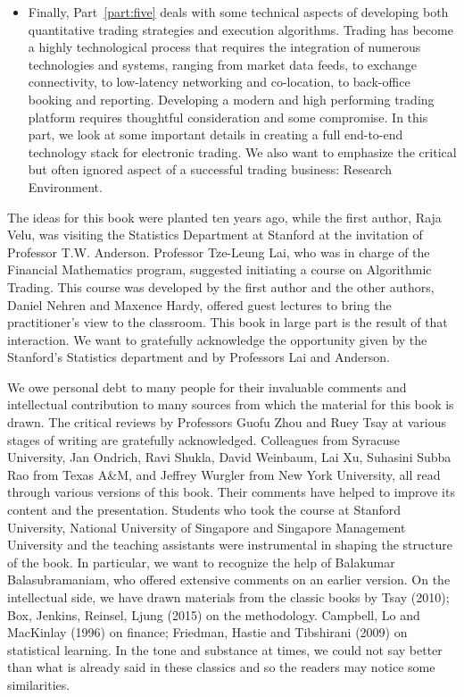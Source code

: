 \begin{itemize}
\item Finally, Part~\ref{part:five} deals with some technical aspects of developing both quantitative trading strategies and execution algorithms. Trading has become a highly technological process that requires the integration of numerous technologies and systems,  ranging from market data feeds, to exchange connectivity, to low-latency networking and co-location, to back-office booking and reporting. Developing a modern and high performing trading platform requires thoughtful consideration and some compromise. In this part, we look at some important details in creating a full end-to-end technology stack for electronic trading. We also want to emphasize the critical but often ignored aspect of a successful trading business: Research Environment. \twomedskip
\end{itemize} 


 The ideas for this book were planted ten years ago, while the first author, Raja Velu, was visiting the Statistics Department at Stanford at the invitation of Professor T.W. Anderson. Professor Tze-Leung Lai, who was in charge of the Financial Mathematics program, suggested initiating a course on Algorithmic Trading. This course was developed by the first author and the other authors, Daniel Nehren and Maxence Hardy, offered guest lectures to bring the practitioner's view to the classroom. This book in large part is the result of that interaction. We want to gratefully acknowledge the opportunity given by the Stanford's Statistics department and by Professors Lai and Anderson. 


We owe personal debt to many people for their invaluable comments and intellectual contribution to many sources from which the material for this book is drawn. The critical reviews by Professors Guofu Zhou and Ruey Tsay at various stages of writing are gratefully acknowledged. Colleagues from Syracuse University, Jan Ondrich, Ravi Shukla, David Weinbaum, Lai Xu, Suhasini Subba Rao from Texas A\&M, and Jeffrey Wurgler from New York University, all read through various versions of this book. Their comments have helped to improve its content and the presentation. Students who took the course at Stanford University, National University of Singapore and Singapore Management University and the teaching assistants were instrumental in shaping the structure of the book. In particular, we want to recognize the help of Balakumar Balasubramaniam, who offered extensive comments on an earlier version. On the intellectual side, we have drawn materials from the classic books by Tsay (2010); Box, Jenkins, Reinsel, Ljung (2015) on the methodology. Campbell, Lo and MacKinlay (1996) on finance; Friedman, Hastie and Tibshirani (2009) on statistical learning. In the tone and substance at times, we could not say better than what is already said in these classics and so the readers may notice some similarities.


